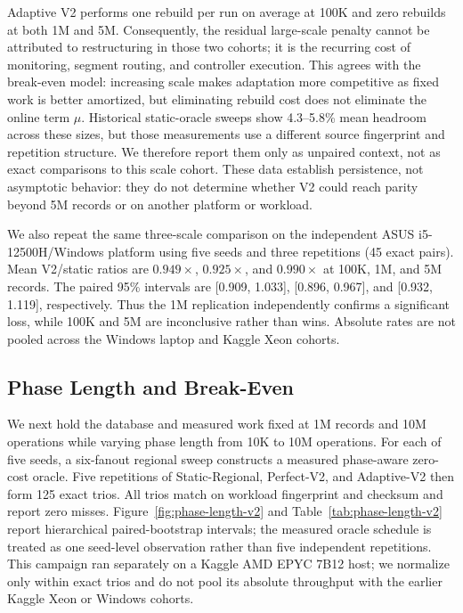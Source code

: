 \documentclass[sigconf,review,anonymous]{acmart}
\begin{document}


Adaptive V2 performs one rebuild per run on average at 100K and zero rebuilds
at both 1M and 5M.  Consequently, the residual large-scale penalty cannot be
attributed to restructuring in those two cohorts; it is the recurring cost of
monitoring, segment routing, and controller execution.  This agrees with the
break-even model: increasing scale makes adaptation more competitive as fixed
work is better amortized, but eliminating rebuild cost does not eliminate the
online term \(\mu\).  Historical static-oracle sweeps show 4.3--5.8\% mean
headroom across these sizes, but those measurements use a different source
fingerprint and repetition structure.  We therefore report them only as
unpaired context, not as exact comparisons to this scale cohort.  These data
establish persistence, not asymptotic behavior: they do not determine whether
V2 could reach parity beyond 5M records or on another platform or workload.

We also repeat the same three-scale comparison on the independent ASUS
i5-12500H/Windows platform using five seeds and three repetitions (45 exact
pairs).  Mean V2/static ratios are \(0.949\times\), \(0.925\times\), and
\(0.990\times\) at 100K, 1M, and 5M records.  The paired 95\% intervals are
[0.909, 1.033], [0.896, 0.967], and [0.932, 1.119], respectively.  Thus the
1M replication independently confirms a significant loss, while 100K and 5M
are inconclusive rather than wins.  Absolute rates are not pooled across the
Windows laptop and Kaggle Xeon cohorts.

\subsection{Phase Length and Break-Even}

We next hold the database and measured work fixed at 1M records and 10M
operations while varying phase length from 10K to 10M operations.  For each
of five seeds, a six-fanout regional sweep constructs a measured phase-aware
zero-cost oracle.  Five repetitions of Static-Regional, Perfect-V2, and
Adaptive-V2 then form 125 exact trios.  All trios match on workload
fingerprint and checksum and report zero misses.  Figure~\ref{fig:phase-length-v2}
and Table~\ref{tab:phase-length-v2} report hierarchical paired-bootstrap
intervals; the measured oracle schedule is treated as one seed-level
observation rather than five independent repetitions.
This campaign ran separately on a Kaggle AMD EPYC 7B12 host; we normalize
only within exact trios and do not pool its absolute throughput with the
earlier Kaggle Xeon or Windows cohorts.
\end{document}
